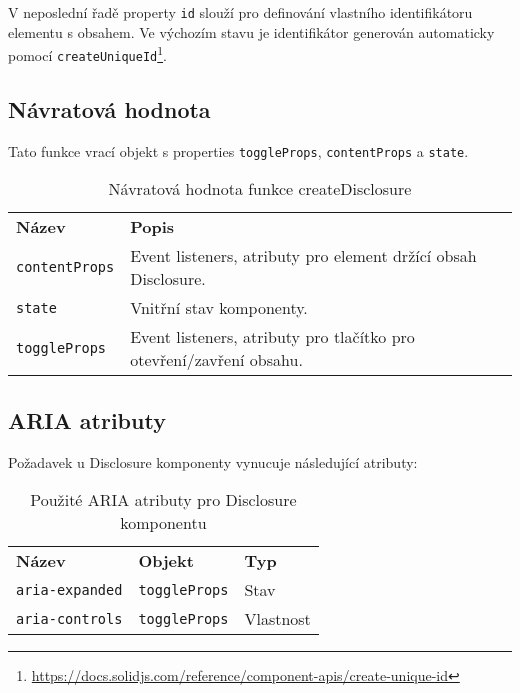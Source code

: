 V neposlední řadě property \texttt{id} slouží pro definování vlastního identifikátoru elementu s obsahem.
Ve výchozím stavu je identifikátor generován automaticky pomocí \texttt{createUniqueId}\footnote{\url{https://docs.solidjs.com/reference/component-apis/create-unique-id}}.

\clearpage

\subsection{Návratová hodnota}

Tato funkce vrací objekt s properties \texttt{toggleProps}, \texttt{contentProps} a \texttt{state}.

\begin{table}[ht]\label{table:disclosure-return}
    \begin{ctucolortab}
        \begin{tabularx}{\textwidth}{p{3cm} X}
            \bfseries Název       & \bfseries Popis                                                     \\\Midrule{}
            \texttt{contentProps} & Event listeners, atributy pro element držící obsah Disclosure.      \\
            \texttt{state}        & Vnitřní stav komponenty.                                            \\
            \texttt{toggleProps}  & Event listeners, atributy pro tlačítko pro otevření/zavření obsahu.
        \end{tabularx}
    \end{ctucolortab}
    \caption{Návratová hodnota funkce createDisclosure}
\end{table}

\subsection{ARIA atributy}

Požadavek \hyperref[ofr12]{} u Disclosure komponenty vynucuje následující atributy:

\begin{table}[ht]\label{table:disclosure-aria}
    \begin{ctucolortab}
        \begin{tabularx}{\textwidth}{X X X}
            \bfseries Název        & \bfseries Objekt     & \bfseries Typ \\\Midrule{}
            \texttt{aria-expanded} & \texttt{toggleProps} & Stav          \\
            \texttt{aria-controls} & \texttt{toggleProps} & Vlastnost
        \end{tabularx}
    \end{ctucolortab}
    \caption{Použité ARIA atributy pro Disclosure komponentu}
\end{table}

